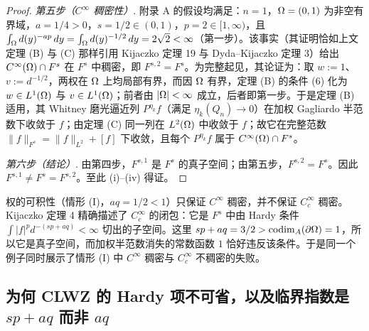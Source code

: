 \begin{proof}
\emph{第五步（$C^\infty$ 稠密性）}. 附录 A 的假设均满足：$n=1$，$\Omega=(0,1)$ 为非空有界域，$a=1/4>0$，$s=1/2\in(0,1)$，$p=2\in[1,\infty)$，且 $\int_\Omega d(y)^{-ap}\,dy=\int_\Omega d(y)^{-1/2}\,dy=2\sqrt2<\infty$（第一步）。该事实（其证明恰如上文定理 (B) 与 (C) 那样引用 Kijaczko 定理 19 与 Dyda--Kijaczko 定理 3）给出 $C^\infty(\Omega)\cap F^s$ 在 $F^s$ 中稠密，即 $F^{s,2}=F^s$。为完整起见，其论证为：取 $w:=1$、$v:=d^{-1/2}$，两权在 $\Omega$ 上均局部有界，而因 $\Omega$ 有界，定理 (B) 的条件 (6) 化为 $w\in L^1(\Omega)$ 与 $v\in L^1(\Omega)$；前者由 $|\Omega|<\infty$ 成立，后者即第一步。于是定理 (B) 适用，其 Whitney 磨光逼近列 $P^{\eta_k}f$（满足 $\eta_k(Q_n)\to0$）在加权 Gagliardo 半范数下收敛于 $f$；由定理 (C) 同一列在 $L^2(\Omega)$ 中收敛于 $f$；故它在完整范数 $\|f\|_{F^s}=\|f\|_{L^2}+[f]$ 下收敛，且每个 $P^{\eta_k}f$ 属于 $C^\infty(\Omega)\cap F^s$。

\emph{第六步（结论）}. 由第四步，$F^{s,1}$ 是 $F^s$ 的真子空间；由第五步，$F^{s,2}=F^s$。因此 $F^{s,1}\neq F^s=F^{s,2}$。至此 (i)--(iv) 得证。
\end{proof}

\begin{remark}[直觉]
权的可积性（情形 (I)，$aq=1/2<1$）只保证 $C^\infty$ 稠密，并不保证 $C_c^\infty$ 稠密。Kijaczko 定理 4 精确描述了 $C_c^\infty$ 的闭包：它是 $F^s$ 中由 Hardy 条件 $\int|f|^p d^{-(sp+aq)}<\infty$ 切出的子空间。这里 $sp+aq=3/2>\operatorname{codim}_{A}(\partial\Omega)=1$，所以它是真子空间，而加权半范数消失的常数函数 $1$ 恰好违反该条件。于是同一个例子同时展示了情形 (I) 中 $C^\infty$ 稠密与 $C_c^\infty$ 不稠密的失败。
\end{remark}

\subsection{为何 CLWZ 的 Hardy 项不可省，以及临界指数是 \texorpdfstring{$sp+aq$}{sp+aq} 而非 \texorpdfstring{$aq$}{aq}}

